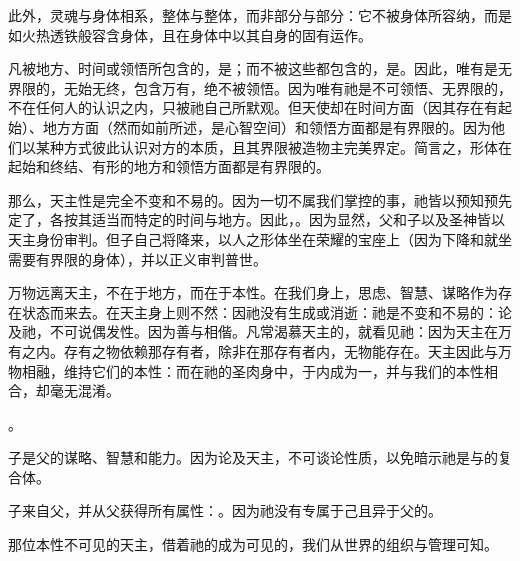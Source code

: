 此外，灵魂与身体相系，整体与整体，而非部分与部分：它不被身体所容纳，而是如火热透铁般容含身体，且在身体中以其自身的固有运作。\par

凡被地方、时间或领悟所包含的，是；而不被这些都包含的，是。因此，唯有是无界限的，无始无终，包含万有，绝不被领悟。因为唯有祂是不可领悟、无界限的，不在任何人的认识之内，只被祂自己所默观。但天使却在时间方面（因其存在有起始）、地方方面（然而如前所述，是心智空间）和领悟方面都是有界限的。因为他们以某种方式彼此认识对方的本质，且其界限被造物主完美界定。简言之，形体在起始和终结、有形的地方和领悟方面都是有界限的。\par

\par

那么，天主性是完全不变和不易的。因为一切不属我们掌控的事，祂皆以预知预先定了，各按其适当而特定的时间与地方。因此，。因为显然，父和子以及圣神皆以天主身份审判。但子自己将降来，以人之形体坐在荣耀的宝座上（因为下降和就坐需要有界限的身体），并以正义审判普世。\par

万物远离天主，不在于地方，而在于本性。在我们身上，思虑、智慧、谋略作为存在状态而来去。在天主身上则不然：因祂没有生成或消逝：祂是不变和不易的：论及祂，不可说偶发性。因为善与相偕。凡常渴慕天主的，就看见祂：因为天主在万有之内。存有之物依赖那存有者，除非在那存有者内，无物能存在。天主因此与万物相融，维持它们的本性：而在祂的圣肉身中，于内成为一，并与我们的本性相合，却毫无混淆。\par

。\par

子是父的谋略、智慧和能力。因为论及天主，不可谈论性质，以免暗示祂是与的复合体。\par

子来自父，并从父获得所有属性：。因为祂没有专属于己且异于父的。\par

那位本性不可见的天主，借着祂的成为可见的，我们从世界的组织与管理可知。\par

